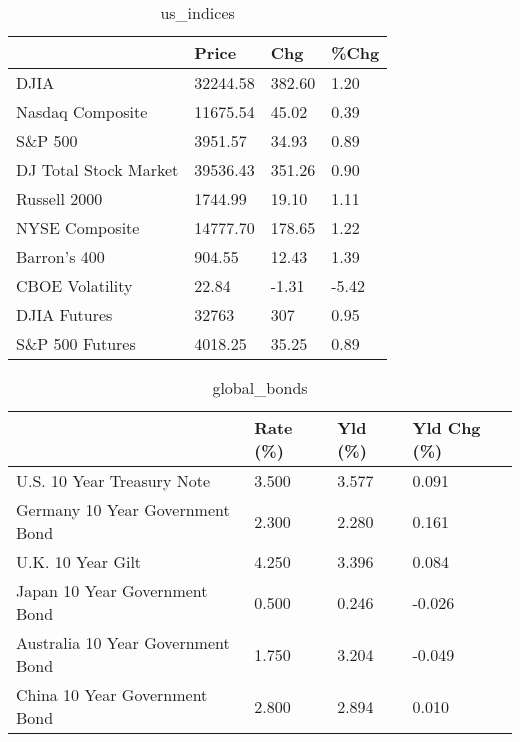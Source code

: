 \documentclass{article}%
\begin{document}
%


\begin{table}[htbp]%
\caption{us\_indices}%
\centering%
\begin{adjustbox}{width=1\textwidth}%
\begin{tabular}{llll}
\toprule
                      &    Price &    Chg &  \%Chg \\
\midrule
                 DJIA & 32244.58 & 382.60 &  1.20 \\
     Nasdaq Composite & 11675.54 &  45.02 &  0.39 \\
              S\&P 500 &  3951.57 &  34.93 &  0.89 \\
DJ Total Stock Market & 39536.43 & 351.26 &  0.90 \\
         Russell 2000 &  1744.99 &  19.10 &  1.11 \\
       NYSE Composite & 14777.70 & 178.65 &  1.22 \\
         Barron's 400 &   904.55 &  12.43 &  1.39 \\
      CBOE Volatility &    22.84 &  -1.31 & -5.42 \\
         DJIA Futures &    32763 &    307 &  0.95 \\
      S\&P 500 Futures &  4018.25 &  35.25 &  0.89 \\
\bottomrule
\end{tabular}
%
\end{adjustbox}%
\end{table}

%


\begin{table}[htbp]%
\caption{global\_bonds}%
\centering%
\begin{adjustbox}{width=1\textwidth}%
\begin{tabular}{llll}
\toprule
                                  & Rate (\%) & Yld (\%) & Yld Chg (\%) \\
\midrule
       U.S. 10 Year Treasury Note &    3.500 &   3.577 &       0.091 \\
  Germany 10 Year Government Bond &    2.300 &   2.280 &       0.161 \\
                U.K. 10 Year Gilt &    4.250 &   3.396 &       0.084 \\
    Japan 10 Year Government Bond &    0.500 &   0.246 &      -0.026 \\
Australia 10 Year Government Bond &    1.750 &   3.204 &      -0.049 \\
    China 10 Year Government Bond &    2.800 &   2.894 &       0.010 \\
\bottomrule
\end{tabular}
%
\end{adjustbox}%
\end{table}
\end{document}
